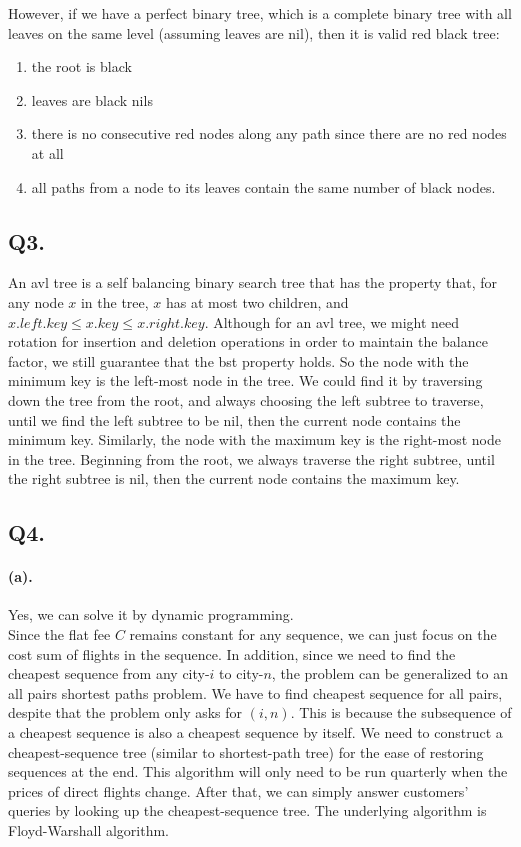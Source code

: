 \documentclass[12pt]{article}
\begin{document}
\noindent However, if we have a perfect binary tree, which is a complete binary tree with all leaves on the same level (assuming leaves are nil), then it is valid red black tree:
     \begin{enumerate}
          \setlength \itemsep{0em} 
          \item the root is black
          \item leaves are black nils
          \item there is no consecutive red nodes along any path since there are no red nodes at all
          \item all paths from a node to its leaves contain the same number of black nodes.
     \end{enumerate}

\subsection*{Q3.}
An avl tree is a self balancing binary search tree that has the property that, for any node \(x\) in the tree, \(x\) has at most two children, and \(x.left.key \leq x.key \leq x.right.key\). Although for an avl tree, we might need rotation for insertion and deletion operations in order to maintain the balance factor, we still guarantee that the bst property holds. So the node with the minimum key is the left-most node in the tree. We could find it by traversing down the tree from the root, and always choosing the left subtree to traverse, until we find the left subtree to be nil, then the current node contains the minimum key. Similarly, the node with the maximum key is the right-most node in the tree. Beginning from the root, we always traverse the right subtree, until the right subtree is nil, then the current node contains the maximum key. 

\subsection*{Q4.}
\paragraph{(a).} Yes, we can solve it by dynamic programming.\\ 
Since the flat fee \(C\) remains constant for any sequence, we can just focus on the cost sum of flights in the sequence. In addition, since we need to find the cheapest sequence from any city-\(i\) to city-\(n\), the problem can be generalized to an all pairs shortest paths problem. We have to find cheapest sequence for all pairs, despite that the problem only asks for \((i,n)\). This is because the subsequence of a cheapest sequence is also a cheapest sequence by itself. We need to construct a cheapest-sequence tree (similar to shortest-path tree) for the ease of restoring sequences at the end. This algorithm will only need to be run quarterly when the prices of direct flights change. After that, we can simply answer customers' queries by looking up the cheapest-sequence tree. The underlying algorithm is Floyd-Warshall algorithm.
\end{document}
